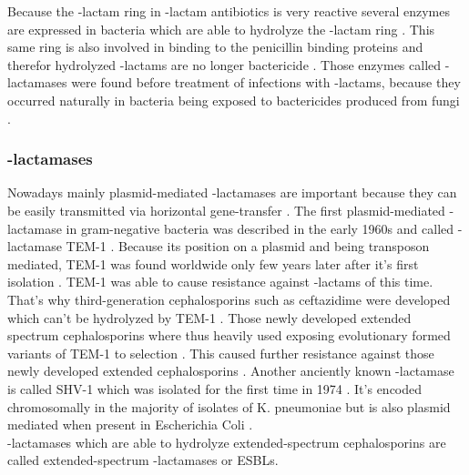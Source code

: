 Because the \textbeta-lactam ring in \textbeta-lactam antibiotics is very reactive several enzymes are expressed in bacteria which are able to hydrolyze the \textbeta-lactam ring \cite{noauthor_beta-lactam_nodate}. This same ring is also involved in binding to the penicillin binding proteins and therefor hydrolyzed \textbeta-lactams are no longer bactericide \cite{noauthor_beta-lactam_nodate}. Those enzymes called \textbeta-lactamases were found before treatment of infections with \textbeta-lactams, because they occurred naturally in bacteria being exposed to bactericides produced from fungi \cite{noauthor_fig._nodateflem}.   

\subsubsection{\textbeta-lactamases}
Nowadays mainly plasmid-mediated \textbeta-lactamases are important because they can be easily transmitted via horizontal gene-transfer \cite{munita_mechanisms_2016}.  
The first plasmid-mediated \textbeta-lactamase in gram-negative bacteria was described in the early 1960s and called \textbeta-lactamase TEM-1 \cite{fernandes_-lactams:_2013}. Because its position on a plasmid and being transposon mediated, TEM-1 was found worldwide only few years later after it's first isolation \cite{fernandes_-lactams:_2013}. TEM-1 was able to cause resistance against \textbeta-lactams of this time.  That's why third-generation cephalosporins such as ceftazidime were developed which can't be hydrolyzed by TEM-1 \cite{fernandes_-lactams:_2013}. Those newly developed extended spectrum cephalosporins where thus heavily used exposing evolutionary formed variants of TEM-1 to selection \cite{fernandes_-lactams:_2013}. This caused further resistance against those newly developed extended cephalosporins \cite{fernandes_-lactams:_2013}. 
Another anciently known \textbeta-lactamase is called SHV-1 which was isolated for the first time in 1974 \cite{kuzin_structure_1999}. It's encoded chromosomally in the majority of isolates of K. pneumoniae but is also plasmid mediated when present in Escherichia Coli \cite{kuzin_structure_1999}. \\
\textbeta-lactamases which are able to hydrolyze extended-spectrum cephalosporins are called extended-spectrum \textbeta-lactamases or ESBLs. 

